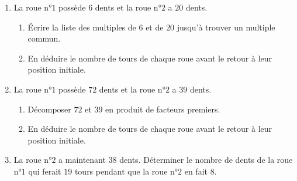 \begin{exercice*}
    \begin{enumerate}
        \item     La roue n°$1$ possède $6$ dents et la roue n°$2$ a $20$ dents.
        \begin{enumerate}
            \item Écrire la liste des multiples de $6$ et de $20$ jusqu'à trouver un multiple commun.
            \item En déduire le nombre de tours de chaque roue avant le retour à leur position initiale.
        \end{enumerate}
        \item La roue n°$1$ possède $72$ dents et la roue n°$2$ a $39$ dents.
        \begin{enumerate}
            \item Décomposer $72$ et $39$ en produit de facteurs premiers.
            \item En déduire le nombre de tours de chaque roue avant le retour à leur position initiale.
        \end{enumerate}
        \item La roue n°$2$ a maintenant $38$ dents. Déterminer le nombre de dents de la roue n°$1$ qui ferait $19$ tours pendant que la roue n°$2$ en fait $8$.
    \end{enumerate}        

\end{exercice*}
